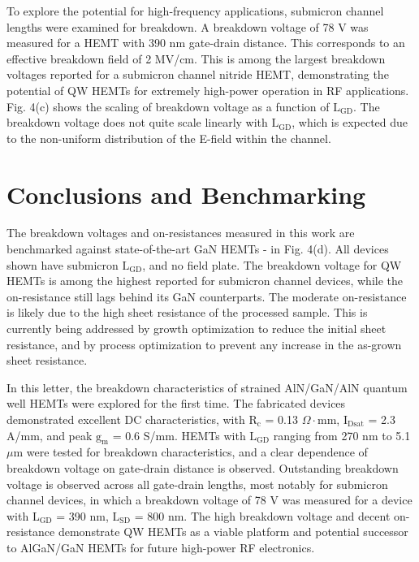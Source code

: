 \documentclass[journal]{IEEEtran}
\begin{document}
To explore the potential for high-frequency applications, submicron channel lengths were examined for breakdown. A breakdown voltage of 78 V was measured for a HEMT with 390 nm gate-drain distance. This corresponds to an effective breakdown field of 2 MV/cm. This is among the largest breakdown voltages reported for a submicron channel nitride HEMT, demonstrating the potential of QW HEMTs for extremely high-power operation in RF applications. Fig. 4(c) shows the scaling of breakdown voltage as a function of $\mathrm{L_{GD}}$. The breakdown voltage does not quite scale linearly with $\mathrm{L_{GD}}$, which is expected due to the non-uniform distribution of the E-field within the channel.



\section{Conclusions and Benchmarking}
The breakdown voltages and on-resistances measured in this work are benchmarked against state-of-the-art GaN HEMTs \cite{b12}-\cite{b27} in Fig. 4(d). All devices shown have submicron $\mathrm{L_{GD}}$, and no field plate. The breakdown voltage for QW HEMTs is among the highest reported for submicron channel devices, while the on-resistance still lags behind its GaN counterparts. The moderate on-resistance is likely due to the high sheet resistance of the processed sample. This is currently being addressed by growth optimization to reduce the initial sheet resistance, and by process optimization to prevent any increase in the as-grown sheet resistance.

In this letter, the breakdown characteristics of strained AlN/GaN/AlN quantum well HEMTs were explored for the first time. The fabricated devices demonstrated excellent DC characteristics, with $\mathrm{R_c}$ = 0.13 $\Omega\cdot$mm, $\mathrm{I_{Dsat}}$ = 2.3 A/mm, and peak $\mathrm{g_m}$ = 0.6 S/mm. HEMTs with $\mathrm{L_{GD}}$ ranging from 270 nm to 5.1 $\mu$m were tested for breakdown characteristics, and a clear dependence of breakdown voltage on gate-drain distance is observed. Outstanding breakdown voltage is observed across all gate-drain lengths, most notably for submicron channel devices, in which a breakdown voltage of 78 V was measured for a device with $\mathrm{L_{GD}}$ = 390 nm, $\mathrm{L_{SD}}$ = 800 nm. The high breakdown voltage and decent on-resistance demonstrate QW HEMTs as a viable platform and potential successor to AlGaN/GaN HEMTs for future high-power RF electronics.
\end{document}
